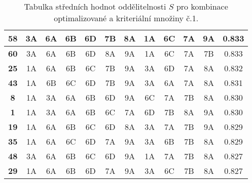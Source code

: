 \begin{table}
\begin{tabular}{|c||c|c|c|c|c|c||c|c|c|c||c|}
\hline
\textbf{58} & 3A & 6A & 6B & 6D & 7B & 8A & 1A & 6C & 7A & 9A & 0.833 \\
\hline
\textbf{60} & 3A & 6A & 6B & 6D & 8A & 9A & 1A & 6C & 7A & 7B & 0.833 \\
\hline
\textbf{25} & 1A & 6A & 6B & 6C & 7B & 9A & 3A & 6D & 7A & 8A & 0.832 \\
\hline
\textbf{43} & 1A & 6B & 6C & 6D & 7B & 9A & 3A & 6A & 7A & 8A & 0.831 \\
\hline
\textbf{8} & 1A & 3A & 6A & 6B & 6D & 9A & 6C & 7A & 7B & 8A & 0.830 \\
\hline
\textbf{1} & 1A & 3A & 6A & 6B & 6C & 7A & 6D & 7B & 8A & 9A & 0.830 \\
\hline
\textbf{19} & 1A & 6A & 6B & 6C & 6D & 8A & 3A & 7A & 7B & 9A & 0.829 \\
\hline
\textbf{35} & 1A & 6A & 6C & 6D & 7A & 9A & 3A & 6B & 7B & 8A & 0.829 \\
\hline
\textbf{48} & 3A & 6A & 6B & 6C & 6D & 9A & 1A & 7A & 7B & 8A & 0.827 \\
\hline
\textbf{29} & 1A & 6A & 6B & 6D & 7A & 9A & 3A & 6C & 7B & 8A & 0.827 \\
\hline
\end{tabular}
\caption{Tabulka středních hodnot oddělitelnosti $S$ pro kombinace optimalizované a kriteriální množiny č.1.}
\label{table: MeanSeperability1}
\end{table}



